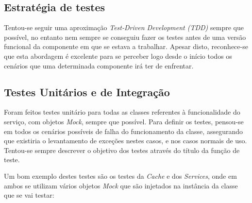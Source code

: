 \documentclass[10pt,english]{article}
\begin{document}
\subsection{Estratégia de testes}

\par Tentou-se seguir uma aproximação \textit{Test-Driven Development (TDD)} sempre que possível, no entanto nem sempre se conseguiu fazer os testes antes de uma versão funcional da componente em que se estava a trabalhar. Apesar disto, reconhece-se que esta abordagem é excelente para se perceber logo desde o início todos os cenários que uma determinada componente irá ter de enfrentar.

\clearpage 

\subsection{Testes Unitários e de Integração}

\par Foram feitos testes unitário para todas as classes referentes à funcionalidade do serviço, com objetos \textit{Mock}, sempre que possível. Para definir os testes, pensou-se em todos os cenários possíveis de falha do funcionamento da classe, assegurando que existiria o levantamento de exceções nestes casos, e nos casos normais de uso. Tentou-se sempre descrever o objetivo dos testes através do título da função de teste.

\par Um bom exemplo destes testes são os testes da \textit{Cache} e dos \textit{Services}, onde em ambos se utilizam vários objetos \textit{Mock} que são injetados na instância da classe que se vai testar:
\end{document}
